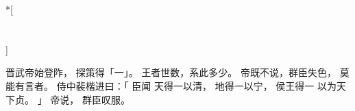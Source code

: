 
\switchcolumn[0]*[\section{}]

晋武帝始登阼，
探策得「一」。
王者世数，系此多少。
帝既不说，群臣失色，
莫能有言者。
侍中裴楷进曰：「
    臣闻
    天得一以清，
    地得一以宁，
    侯王得一
    以为天下贞。
」
帝说，
群臣叹服。

\switchcolumn



